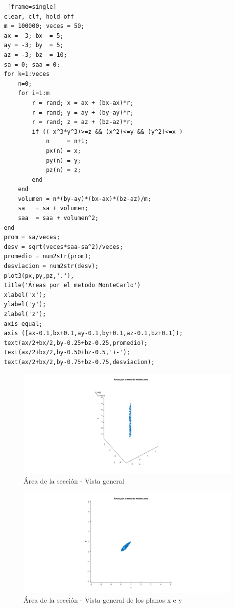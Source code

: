 \documentclass{article}
\begin{document}
\begin{lstlisting} [frame=single]
clear, clf, hold off
m = 100000; veces = 50;
ax = -3; bx  = 5;
ay = -3; by  = 5;
az = -3; bz  = 10; 
sa = 0; saa = 0;
for k=1:veces
    n=0;
    for i=1:m
        r = rand; x = ax + (bx-ax)*r;
        r = rand; y = ay + (by-ay)*r;
        r = rand; z = az + (bz-az)*r;
        if (( x^3*y^3)>=z && (x^2)<=y && (y^2)<=x )
            n     = n+1;
            px(n) = x; 
            py(n) = y;
            pz(n) = z;
        end
    end
    volumen = n*(by-ay)*(bx-ax)*(bz-az)/m;
    sa   = sa + volumen;
    saa  = saa + volumen^2;
end
prom = sa/veces;
desv = sqrt(veces*saa-sa^2)/veces;
promedio = num2str(prom);
desviacion = num2str(desv);
plot3(px,py,pz,'.'),
title('Áreas por el metodo MonteCarlo') 
xlabel('x');
ylabel('y');
zlabel('z');
axis equal;
axis ([ax-0.1,bx+0.1,ay-0.1,by+0.1,az-0.1,bz+0.1]);
text(ax/2+bx/2,by-0.25+bz-0.25,promedio);
text(ax/2+bx/2,by-0.50+bz-0.5,'+-');
text(ax/2+bx/2,by-0.75+bz-0.75,desviacion);
\end{lstlisting}



\begin{figure}[H]
\centering
    \includegraphics[width=1\textwidth]{images/FIG09A.png}
    \caption{Área de la sección - Vista general}
\end{figure}

\begin{figure}[H]
\centering
    \includegraphics[width=1\textwidth]{images/FIG09B.png}
    \caption{Área de la sección - Vista general de los planos x e y}
\end{figure}
\end{document}
